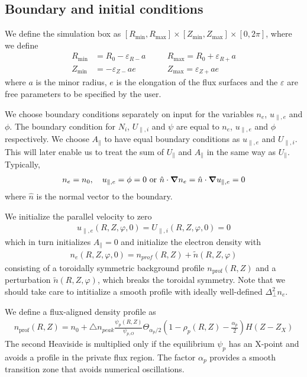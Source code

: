 \subsection{Boundary and initial conditions}
We define the simulation box as
$[ R_{\min}, R_{\max}]\times [Z_{\min}, Z_{\max}] \times [0,2\pi]$,
where we define
\begin{align} \label{eq:box}
    R_{\min}&=R_0-\varepsilon_{R-}a\quad
    &&R_{\max}=R_0+\varepsilon_{R+}a\nonumber\\
    Z_{\min}&=-\varepsilon_{Z-}ae\quad
    &&Z_{\max}=\varepsilon_{Z+}ae
\end{align}
where $a$ is the minor radius, $e$ is the elongation of the flux surfaces and
the $\varepsilon$ are free parameters to be specified by the user.

We choose boundary conditions separately on input for the variables
$n_e$, $u_{\parallel,e}$ and $\phi$. The boundary condition for $N_i$, $U_{\parallel,i}$ and
$\psi$ are equal to $n_e$, $u_{\parallel,e}$ and $\phi$ respectively.
We choose $A_\parallel$ to have equal boundary conditions as $u_{\parallel,e}$ and $U_{\parallel,i}$.
This will later enable us to treat the sum of $U_\parallel$ and $A_\parallel$
in the same way as $U_\parallel$.
Typically,
\begin{align}
n_e = n_0, \quad u_{\parallel,e} = \phi = 0
\text{ or } \hat n \cdot{\boldsymbol{\nabla}} n_e = \hat n \cdot{\boldsymbol{\nabla}} u_{\parallel,e} = 0
\end{align}
where $\hat n$ is the normal vector to the boundary.

We initialize the parallel velocity to zero
\begin{align}
  u_{\parallel,e}(R,Z,\varphi,0) = U_{\parallel,i}(R,Z,\varphi,0) = 0
  \label{}
\end{align}
which in turn initializes $A_\parallel = 0$
and initialize the electron density with
\begin{align} \label{eq:initial_ne}
    n_e(R,Z,\varphi, 0)= n_{prof}(R,Z) + \tilde n(R,Z,\varphi)
\end{align}
consisting of a toroidally symmetric background profile $n_{\text{prof}}(R,Z)$ and a perturbation
$\tilde n(R,Z,\varphi)$, which breaks the toroidal symmetry.
Note that we should take care to intitialize a smooth profile with ideally well-defined $\Delta^2_\perp n_e$.

We define a flux-aligned density profile as
\begin{align} \label{eq:density_profile}
  n_{\text{prof}}(R,Z)=
  n_0 + \triangle n_{peak}\frac{\psi_p(R,Z) }{\psi_{p,O}}\Theta_{\alpha_p/2}\left(1-\rho_p(R, Z)-\frac{\alpha_p}{2}\right) H(Z-Z_X)
\end{align}
The second Heaviside is multiplied only if the equilibrium $\psi_p$ has an
X-point and avoids a profile in the private flux region. The factor $\alpha_p$ provides a smooth transition
zone that avoids numerical oscillations.


